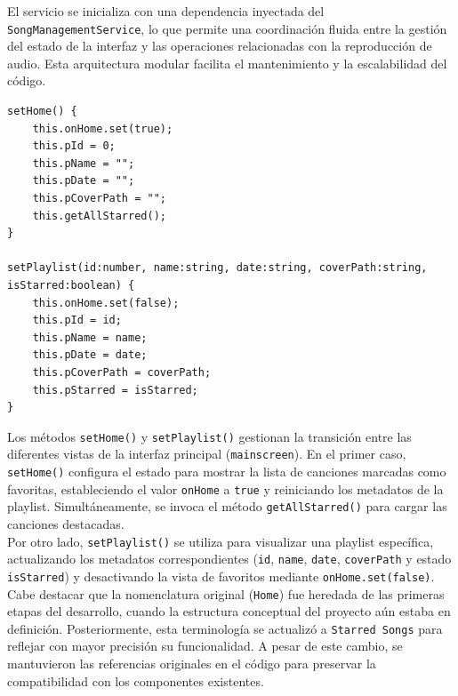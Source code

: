 \documentclass[11pt, a4paper]{article}
\begin{document}
                El servicio se inicializa con una dependencia inyectada del \\ \verb|SongManagementService|, lo que permite una coordinación fluida entre la gestión del estado de la interfaz y las operaciones relacionadas con la reproducción de audio. Esta arquitectura modular facilita el mantenimiento y la escalabilidad del código. \\


                \begin{lstlisting}[caption={setHome() y setPlaylist()}]
setHome() {
    this.onHome.set(true);
    this.pId = 0;
    this.pName = "";
    this.pDate = "";
    this.pCoverPath = "";
    this.getAllStarred();
}

setPlaylist(id:number, name:string, date:string, coverPath:string, isStarred:boolean) {
    this.onHome.set(false);
    this.pId = id;
    this.pName = name;
    this.pDate = date;
    this.pCoverPath = coverPath;
    this.pStarred = isStarred;
}
                \end{lstlisting}

                Los métodos \verb|setHome()| y \verb|setPlaylist()| gestionan la transición entre las diferentes vistas de la interfaz principal (\verb|mainscreen|). En el primer caso, \verb|setHome()| configura el estado para mostrar la lista de canciones marcadas como favoritas, estableciendo el valor \verb|onHome| a \verb|true| y reiniciando los metadatos de la playlist. Simultáneamente, se invoca el método \verb|getAllStarred()| para cargar las canciones destacadas. \\

                Por otro lado, \verb|setPlaylist()| se utiliza para visualizar una playlist específica, actualizando los metadatos correspondientes (\verb|id|, \verb|name|, \verb|date|, \verb|coverPath| y estado \verb|isStarred|) y desactivando la vista de favoritos mediante \verb|onHome.set(false)|. \\

                Cabe destacar que la nomenclatura original (\verb|Home|) fue heredada de las primeras etapas del desarrollo, cuando la estructura conceptual del proyecto aún estaba en definición. Posteriormente, esta terminología se actualizó a \verb|Starred Songs| para reflejar con mayor precisión su funcionalidad. A pesar de este cambio, se mantuvieron las referencias originales en el código para preservar la compatibilidad con los componentes existentes. \\
\end{document}
